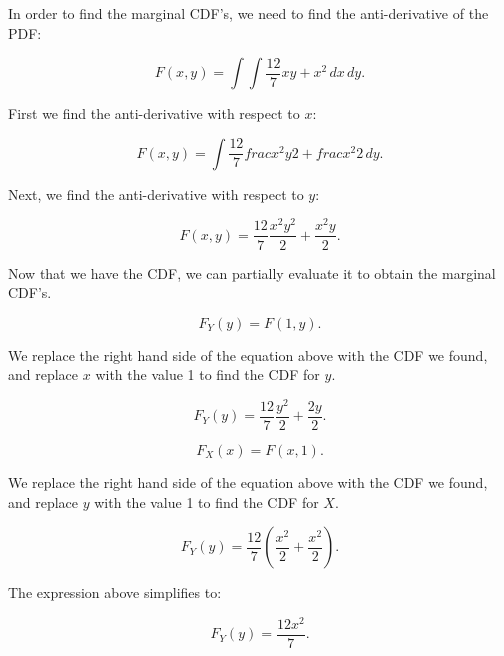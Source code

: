 \documentclass[a5paper,11pt]{article}
\begin{document}
In order to find the marginal CDF's, we
need to find the anti-derivative of the
PDF:

\begin{equation}
F\left( x, y \right) =
\int \int \frac{12}{7} xy + x^2 \,dx \,dy.
\end{equation}

First we find the anti-derivative with
respect to $x$:

\begin{equation}
F\left( x, y \right) =
\int \frac{12}{7} frac{x^2y}{2}
 + frac{x^2}{2} \,dy.
\end{equation}

Next, we find the anti-derivative with
respect to $y$:

\begin{equation}
F\left( x, y \right) =
\frac{12}{7} \frac{x^2y^2}{2}
 + \frac{x^2y}{2}. 
\end{equation}

Now that we have the CDF, we can partially
evaluate it to obtain the marginal CDF's.

\begin{equation}
F_{Y} \left(y \right) = F \left(1,y \right).
\end{equation}

We replace the right hand side of the 
equation above with the CDF we found, and
replace $x$ with the value 1 to find
the CDF for $y$.

\begin{equation}
F_{Y} \left(y \right) = 
\frac{12}{7} \frac{y^2}{2}
 + \frac{2y}{2}. 
\end{equation}

\begin{equation}
F_{X} \left(x \right) = F \left(x,1 \right).
\end{equation}

We replace the right hand side of the 
equation above with the CDF we found, and
replace $y$ with the value 1 to find
the CDF for $X$.

\begin{equation}
F_{Y} \left(y \right) =
 \frac{12}{7} \left(\frac{x^2}{2}
 + \frac{x^2}{2} \right). 
\end{equation}

The expression above simplifies to:

\begin{equation}
F_{Y} \left(y \right) =
 \frac{12 x^2}{7}. 
\end{equation}
\end{document}
